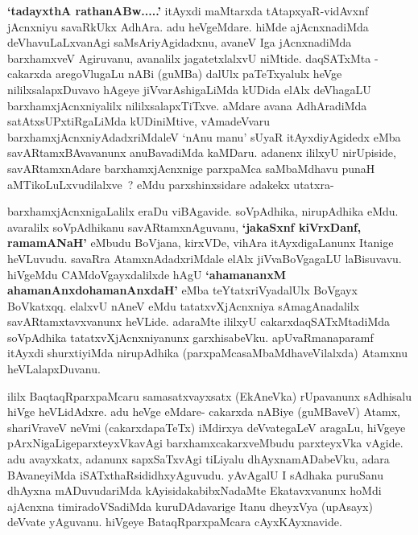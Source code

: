 \begin{artha}
\textbf{`tadayxthA rathanABw.....'} itAyxdi maMtarxda tAtapxyaR-vidAvxnf jAcnxniyu  savaRkUkx AdhAra. adu heVgeMdare. hiMde ajAcnxnadiMda deVhavuLaLxvanAgi saMsAriyAgidadxnu, avaneV Iga jAcnxnadiMda barxhamxveV Agiruvanu, avanalilx jagatetxlalxvU niMtide. daqSATxMta - cakarxda aregoVlugaLu nABi (guMBa) dalUlx paTeTxyalulx heVge nililxsalapxDuvavo hAgeye jiVvarAshigaLiMda kUDida elAlx deVhagaLU \-barxhamxjAcnxniyalilx nililxsalapxTiTxve. aMdare avana AdhAradiMda satAtxsUPxtiRgaLiMda kUDiniMtive, vAmadeVvaru barxhamxjAcnxniyAdadxriMdaleV `nAnu manu' sUyaR itAyxdiyAgidedx eMba savARtamxBAvavanunx anuBavadiMda kaMDaru. adanenx ililxyU nirUpiside, savARtamxnAdare barxhamxjAcnxnige parxpaMca saMbaMdhavu punaH aMTikoLuLxvudilalxve~? eMdu parxshinxsidare adakekx utatxra- 

barxhamxjAcnxnigaLalilx eraDu viBAgavide. soVpAdhika, nirupAdhika eMdu. avaralilx soVpAdhikanu savARtamxnAguvanu, \textbf{`jakaSxnf kiVrxDanf, ramamANaH'} eMbudu BoVjana, kirxVDe, vihAra itAyxdigaLanunx Itanige heVLuvudu. savaRra AtamxnAdadxriMdale elAlx jiVvaBoVgagaLU laBisuvavu. hiVgeMdu CAMdoVgayxdalilxde hAgU \textbf{`ahamananxM ahamanAnxdo\s hamanAnxdaH'} eMba teYtatxriVyadalUlx BoVgayx BoVkatxqq. elalxvU nAneV eMdu tatatxvXjAcnxniya sAmagAnadalilx savARtamxtavxvanunx heVLide. adaraMte ililxyU cakarxdaqSATxMtadiMda soVpAdhika tatatxvXjAcnxniyanunx garxhisabeVku. apUvaRmanaparamf itAyxdi shurxtiyiMda nirupAdhika (parxpaMcasaMbaMdhaveVilalxda) Atamxnu heVLalapxDuvanu.
\end{artha}

\centerline{}

\begin{artha}
ililx BaqtaqRparxpaMcaru samasatxvayxsatx (EkAneVka) rUpavanunx sAdhisalu hiVge heVLidAdxre. adu heVge eMdare- cakarxda nABiye (guMBaveV) Atamx, shariVraveV neVmi (cakarxdapaTeTx) iMdirxya deVvategaLeV aragaLu, hiVgeye pArxNigaLige\break parxteyxVkavAgi barxhamxcakarxveMbudu parxteyxVka vAgide. adu avayxkatx, adanunx sapxSaTxvAgi tiLiyalu dhAyxnamADabeVku, adara BAvaneyiMda iSATxthaRsididhxyAguvudu. yAvAgalU I sAdhaka puruSanu dhAyxna mADuvudariMda kAyisida\break kabibxNadaMte Ekatavxvanunx hoMdi ajAcnxna timiradoVSadiMda kuruDAdavarige Itanu dheyxVya (upAsayx) deVvate  yAguvanu. hiVgeye BataqRparxpaMcara cAyxKAyxnavide.
\end{artha}

\centerline{}

